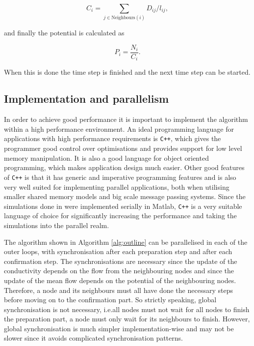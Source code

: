  \begin{equation}
 C_i = \sum_{j \in \text{Neighbours}(i)} D_{ij}/l_{ij},
 \end{equation}
 
 \noindent and finally the potential is calculated as
 
 \begin{equation}
 P_i = \frac{N_i}{C_i}.
 \end{equation}
 
 \noindent When this is done the time step is finished and the next time step can be started.

\subsection{Implementation and parallelism} 
\label{sec:parallel}
In order to achieve good performance it is important to implement the algorithm within a high performance environment. An ideal programming language for applications with high performance requirements is \texttt{C++}, which gives the programmer good control over optimisations and provides support for low level memory manipulation. It is also a good language for object oriented programming, which makes application design much easier. Other good features of \texttt{C++} is that it has generic and imperative programming features and is also very well suited for implementing parallel applications, both when utilising smaller shared memory models and big scale message passing systems. Since the simulations done in \cite{Sumpter} were implemented serially in Matlab, \texttt{C++} is a very suitable language of choice for significantly increasing the performance and taking the simulations into the parallel realm.

The algorithm shown in Algorithm \ref{alg:outline} can be parallelised in each of the outer loops, with synchronisation after each preparation step and after each confirmation step. The synchronisations are necessary since the update of the conductivity depends on the flow from the neighbouring nodes and since the update of the mean flow depends on the potential of the neighbouring nodes. Therefore, a node and its neighbours must all have done the necessary steps before moving on to the confirmation part. So strictly speaking, global synchronisation is not necessary, i.e.\@ all nodes must not wait for all nodes to finish the preparation part, a node must only wait for its neighbours to finish. However, global synchronisation is much simpler implementation-wise and may not be slower since it avoids complicated synchronisation patterns.

